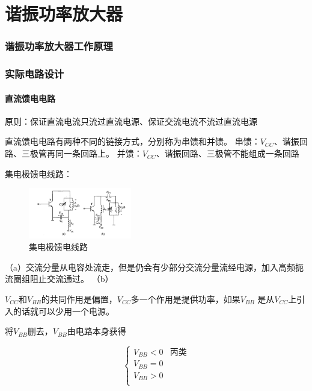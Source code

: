\documentclass[10pt]{article}
\begin{document}
\part{谐振功率放大器}
\section{谐振功率放大器工作原理}
\section{实际电路设计}
\subsection{直流馈电电路}
原则：保证直流电流只流过直流电源、保证交流电流不流过直流电源\par
直流馈电电路有两种不同的链接方式，分别称为串馈和并馈。
串馈：$V_{CC}$、谐振回路、三极管再同一条回路上。
并馈：$V_{CC}$、谐振回路、三极管不能组成一条回路
\begin{example}
    集电极馈电线路：
 \begin{figure}[H] %
  \centering %
  \includegraphics[width=0.4\textwidth]{pictures/2-3.png} %
  \caption{集电极馈电线路} %
  \label{fig.2-3}%
 \end{figure}
 （a）交流分量从电容处流走，但是仍会有少部分交流分量流经电源，加入高频扼流圈组阻止交流通过。
 （b）
\end{example}
$V_{CC}$和$V_{BB}$的共同作用是偏置，$V_{CC}$多一个作用是提供功率，如果$V_{BB}$
是从$V_{CC}$上引入的话就可以少用一个电源。\par
将$V_{BB}$删去，$V_{BB}$由电路本身获得

$$
\left\{  
    \begin{array}{cc}  
        V_{BB} < 0 & \text{丙类}\\  
        V_{BB} = 0\\  
        V_{BB} > 0\\    
    \end{array}  
\right.  
$$
\end{document}
